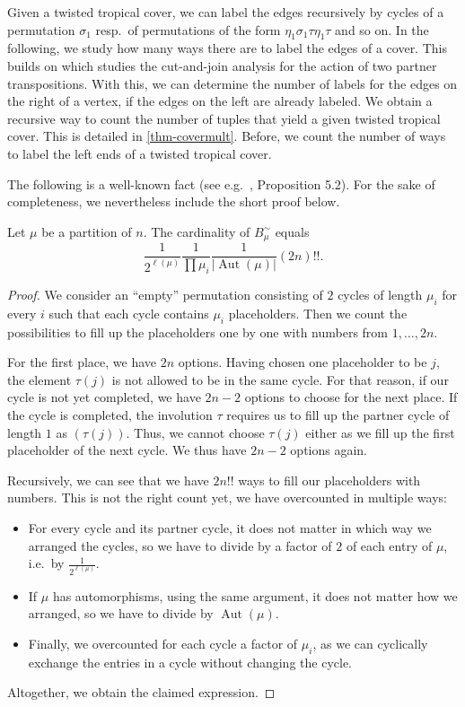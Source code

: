 \documentclass[ALCO,published]{cedram}
\DeclareMathOperator{\Aut}{Aut}
\begin{document}
\begin{rema}
    Given a twisted tropical cover, we can label the edges recursively by cycles of a permutation $\sigma_1$ resp.\ of permutations of the form $\eta_1\sigma_1\tau\eta_1\tau$ and so on. In the following, we study how many ways there are to label the edges of a cover. This builds on \cite[Theorem 2.12]{BF21} which studies the cut-and-join analysis for the action of two partner transpositions. With this, we can determine the number of labels for the edges on the right of a vertex, if the edges on the left are already labeled. We obtain a recursive way to count the number of tuples that yield a given twisted tropical cover. This is detailed in \cref{thm-covermult}. Before, we count the number of ways to label the left ends of a twisted tropical cover.
\end{rema}

The following is a well-known fact (see e.g.~\cite{goulden1996connection}, Proposition 5.2). For the sake of completeness, we nevertheless include the short proof below.
\begin{lemma}
\label{lem-conjclass}
Let $\mu$ be a partition of $n$.
The cardinality of $B^\sim_\mu$ equals
$$ \frac{1}{2^{\ell(\mu)}} \frac{1}{\prod \mu_i} \frac{1}{|\Aut(\mu)|}(2n)!! .$$
\end{lemma}

\begin{proof}
We consider an ``empty'' permutation consisting of $2$ cycles of length $\mu_i$ for every $i$ such that each cycle contains $\mu_i$ placeholders. Then we count the possibilities to fill up the placeholders one by one with numbers from $1,\ldots,2n$.

For the first place, we have $2n$ options. 
Having chosen one placeholder to be $j$, the element $\tau(j)$ is not allowed to be in the same cycle. For that reason, if our cycle is not yet completed, we have $2n-2$ options to choose for the next place. If the cycle is completed, the involution $\tau$ requires us to fill up the partner cycle of length $1$ as $(\tau(j))$. Thus, we cannot choose $\tau(j)$ either as we fill up the first placeholder of the next cycle. We thus have $2n-2$ options again.

Recursively, we can see that we have $2n!!$ ways to fill our placeholders with numbers. This is not the right count yet, we have overcounted in multiple ways:
\begin{itemize}
    \item For every cycle and its partner cycle, it does not matter in which way we arranged the cycles, so we have to divide by a factor of $2$ of each entry of $\mu$, i.e.\ by $\frac{1}{2^{\ell(\mu)}}$.
    \item If $\mu$ has automorphisms, using the same argument, it does not matter how we arranged, so we have to divide by $\Aut(\mu)$.
    \item Finally, we overcounted for each cycle a factor of $\mu_i$, as we can cyclically exchange the entries in a cycle without changing the cycle.
\end{itemize}
Altogether, we obtain the claimed expression.
\end{proof}
\end{document}
